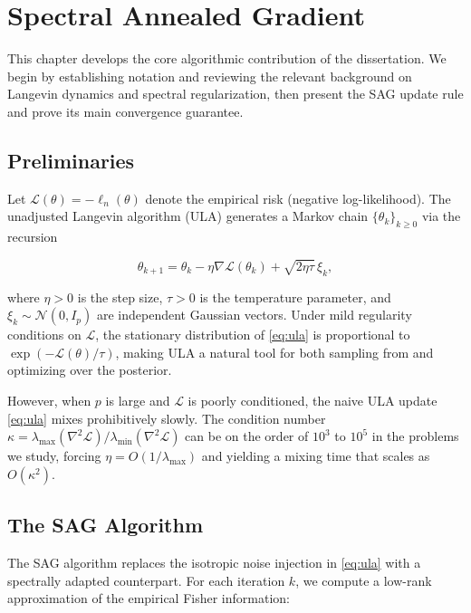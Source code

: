\documentclass[12pt,letterpaper,twoside]{report}
\begin{document}
\chapter{Spectral Annealed Gradient}

This chapter develops the core algorithmic contribution of the dissertation. We begin by establishing notation and reviewing the relevant background on Langevin dynamics and spectral regularization, then present the SAG update rule and prove its main convergence guarantee.

\section{Preliminaries}

Let $\mathcal{L}(\theta) = -\ell_{n}(\theta)$ denote the empirical risk (negative log-likelihood). The unadjusted Langevin algorithm (ULA) \cite{roberts1996} generates a Markov chain $\{\theta_{k}\}_{k \ge 0}$ via the recursion

\begin{equation}\label{eq:ula}
\theta_{k+1} = \theta_{k} - \eta \nabla\mathcal{L}(\theta_{k}) + \sqrt{2\eta\tau}\,\xi_{k},
\end{equation}

\noindent where $\eta > 0$ is the step size, $\tau > 0$ is the temperature parameter, and $\xi_{k} \sim \mathcal{N}(0, I_{p})$ are independent Gaussian vectors. Under mild regularity conditions on $\mathcal{L}$, the stationary distribution of \eqref{eq:ula} is proportional to $\exp(-\mathcal{L}(\theta)/\tau)$, making ULA a natural tool for both sampling from and optimizing over the posterior.

However, when $p$ is large and $\mathcal{L}$ is poorly conditioned, the naive ULA update \eqref{eq:ula} mixes prohibitively slowly. The condition number $\kappa = \lambda_{\max}(\nabla^{2}\mathcal{L}) / \lambda_{\min}(\nabla^{2}\mathcal{L})$ can be on the order of $10^{3}$ to $10^{5}$ in the problems we study, forcing $\eta = O(1/\lambda_{\max})$ and yielding a mixing time that scales as $O(\kappa^{2})$.

\section{The SAG Algorithm}

The SAG algorithm replaces the isotropic noise injection in \eqref{eq:ula} with a spectrally adapted counterpart. For each iteration $k$, we compute a low-rank approximation of the empirical Fisher information:
\end{document}
